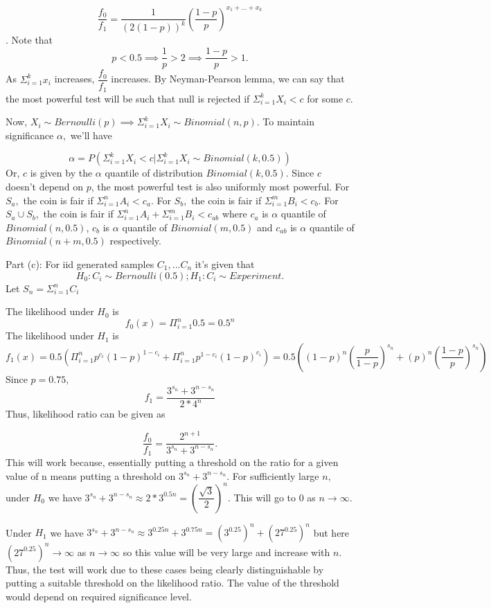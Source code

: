 \documentclass[12pt, oneside]{article}
\begin{document}
\begin{enumerate}
$$\dfrac{f_0}{f_1} = \dfrac{1}{(2(1-p))^k} (\dfrac{1-p}{p})^{x_1+...+x_k}$$. 
Note that $$p < 0.5 \implies \frac{1}{p} > 2 \implies \frac{1-p}{p} > 1.$$ 
As $\Sigma_{i=1}^{k} x_i$ increases, $\dfrac{f_0}{f_1}$ increases. By Neyman-Pearson lemma, we can say that the most powerful test will be such that null is rejected if $\Sigma_{i=1}^{k} X_i < c$ for some $c$.

Now, $X_i \sim Bernoulli(p) \implies \Sigma_{i=1}^{k} X_i \sim Binomial(n,p)$. To maintain significance $\alpha,$ we'll have 

$$\alpha = P(\Sigma_{i=1}^{k} X_i < c | \Sigma_{i=1}^{k} X_i \sim Binomial(k,0.5))$$
Or, $c$ is given by the $\alpha$ quantile of distribution $Binomial(k,0.5)$. Since $c$ doesn't depend on $p$, the most powerful test is also uniformly most powerful. 
\newline For $S_a,$ the coin is fair if $\Sigma_{i=1}^{n} A_i < c_a$. For $S_b,$ the coin is fair if $\Sigma_{i=1}^{m} B_i < c_b$. For $S_a \cup S_b,$ the coin is fair if $\Sigma_{i=1}^{n} A_i + \Sigma_{i=1}^{m} B_i < c_{ab}$ where $c_a$ is $\alpha$ quantile of $Binomial(n,0.5)$, $c_b$ is $\alpha$ quantile of $Binomial(m,0.5)$ and $c_{ab}$ is $\alpha$ quantile of $Binomial(n+m,0.5)$ respectively. 

Part (c): For iid generated samples $C_1,...C_n$ it's given that 
$$H_0 : C_i \sim Bernoulli(0.5); H_1 : C_i \sim Experiment.$$ 
Let $S_n = \Sigma_{i=1}^{n} C_i$

The likelihood under $H_0$ is $$
f_0(x) = \Pi_{i=1}^{n} 0.5 = 0.5^n 
$$
The likelihood under $H_1$ is $$f_1(x) = 0.5(\Pi_{i=1}^{n} p^{c_i} (1-p)^{1-c_i} + \Pi_{i=1}^{n} p^{1-c_i} (1-p)^{c_i}) = 0.5((1-p)^n (\dfrac{p}{1-p})^{s_n} + (p)^n (\dfrac{1-p}{p})^{s_n})$$
Since $p = 0.75,$
$$f_1 = \dfrac{3^{s_n} + 3^{n-s_n}}{2*4^n}
$$
Thus, likelihood ratio can be given as 

$$\dfrac{f_0}{f_1} = \dfrac{2^{n+1}}{3^{s_n} + 3^{n-s_n}}.$$ 
This will work because, essentially putting a threshold on the ratio for a given value of n means putting a threshold on $3^{s_n} + 3^{n-s_n}$. 
For sufficiently large $n,$ under $H_0$ we have $3^{s_n} + 3^{n-s_n} \approx 2*3^{0.5n} = (\dfrac{\sqrt{3}}{2})^n$. This will go to $0$ as $n \to \infty$.    

Under $H_1$ we have $3^{s_n} + 3^{n-s_n} \approx 3^{0.25n} + 3^{0.75n} = (3^{0.25})^n + (27^{0.25})^n$ but here $(27^{0.25})^n \to \infty$ as $n \to \infty$ so this value will be very large and increase with $n$. Thus, the test will work due to these cases being clearly distinguishable by putting a suitable threshold on the likelihood ratio. The value of the threshold would depend on required significance level. 


\end{enumerate}
\end{document}
